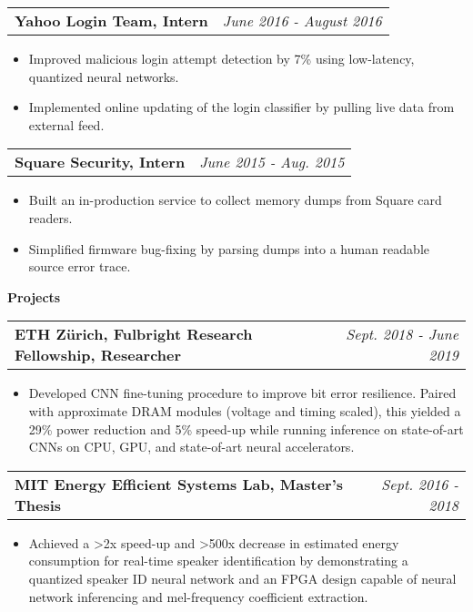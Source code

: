 \documentclass[letterpaper,11pt]{article}
\makeatletter
\newcommand{\resitem}[1]{\item[--] #1 \vspace{-4pt}}
\newcommand{\ressubheadingtwo}[2] {
\begin{tabular*}{7in}{l@{\extracolsep{\fill}}r}
	\textbf{#1} & \textit{#2} \\
\end{tabular*}\vspace{-6pt}}
\makeatother
\begin{document}
	\ressubheadingtwo{Yahoo Login Team, Intern}{June 2016 - August 2016}
	\begin{itemize}
	        \vspace{-1mm}
            \resitem{Improved malicious login attempt detection by 7\% using low-latency, quantized neural networks.}
            \vspace{-1.5mm}
            \resitem{Implemented online updating of the login classifier by pulling live data from external feed.}
	\end{itemize}

    \vspace{0.02in}
	\ressubheadingtwo{Square Security, Intern}{June 2015 - Aug. 2015}
	\begin{itemize}
	        \vspace{-1mm}
            \resitem{Built an in-production service to collect memory dumps from Square card readers.}
            \vspace{-1.5mm}
            \resitem{Simplified firmware bug-fixing by parsing dumps into a human readable source error trace.}
	\end{itemize}

    \vspace{0.05in}

\vspace{0.05in}


\large \textbf{Projects\vspace{1mm}} \normalsize

    \ressubheadingtwo{ETH Z{\"u}rich, Fulbright Research Fellowship, Researcher}{Sept. 2018 - June 2019}{}
	\begin{itemize}
	        \vspace{-1mm}
            \resitem{Developed CNN fine-tuning procedure to improve bit error resilience. Paired with approximate DRAM modules (voltage and timing scaled), this yielded a 29\% power reduction and 5\% speed-up while running inference on state-of-art CNNs on CPU, GPU, and state-of-art neural accelerators.}
	\end{itemize}

	\ressubheadingtwo{MIT Energy Efficient Systems Lab, Master's Thesis}{Sept. 2016 - 2018}{}
	\begin{itemize}
	        \vspace{-1mm}
            \resitem{Achieved a \textgreater 2x speed-up and \textgreater500x decrease in estimated energy consumption for real-time speaker identification by demonstrating a quantized speaker ID neural network and an FPGA design capable of neural network inferencing and mel-frequency coefficient extraction.}
	\end{itemize}
\end{document}
